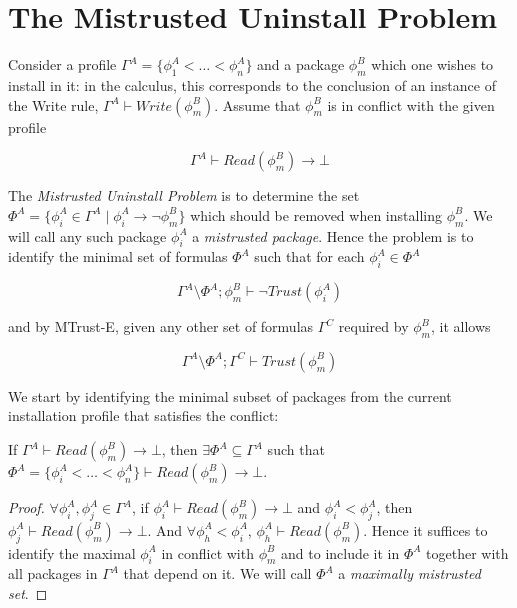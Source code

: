 \documentclass[]{llncs}
\begin{document}
\section{The Mistrusted Uninstall Problem}\label{sec:mistrusted}

Consider a profile $\Gamma^{A}=\{\phi_{1}^{A}< \dots< \phi_{n}^{A}\}$ and a package $\phi^{B}_{m}$ which one wishes to install in it: in the calculus, this corresponds to the conclusion of an instance of the Write rule, $\Gamma^{A}\vdash Write(\phi^{B}_{m})$. Assume that $\phi^{B}_{m}$ is in conflict with the given profile

$$\Gamma^{A}\vdash Read(\phi^{B}_{m}) \rightarrow \bot$$

The \textit{Mistrusted Uninstall Problem} is to determine the set $\Phi^{A}=\{\phi^{A}_{i}\in \Gamma^{A}\mid \phi^{A}_{i}\rightarrow \neg \phi^{B}_{m}\}$ which should be removed when installing $\phi^{B}_{m}$. We will call any such package $\phi^{A}_{i}$ a \textit{mistrusted package}. Hence the problem is to identify the minimal set of formulas $\Phi^{A}$ such that for each $\phi_{i}^{A}\in\Phi^{A}$

$$\Gamma^{A}\setminus \Phi^{A}; \phi^{B}_{m}\vdash \neg Trust(\phi^{A}_{i})$$

and by MTrust-E, given any other set of formulas $\Gamma^{C}$ required by $\phi^{B}_{m}$, it allows

$$\Gamma^{A}\setminus \Phi^{A}; \Gamma^{C} \vdash Trust(\phi^{B}_{m})$$


We start by identifying the minimal subset of packages from the current installation profile that satisfies the conflict:

\begin{lemma}\label{th:gen2}
	If $\Gamma^{A}\vdash Read(\phi^{B}_{m})\rightarrow \bot$, then $\exists \Phi^{A}\subseteq\Gamma^{A}$
	such that $ \Phi^{A}=\{\phi^{A}_{i}< \dots< \phi^{A}_{n}\} \vdash Read(\phi^{B}_{m})\rightarrow \bot$.
\end{lemma}
%
\begin{proof}
$\forall \phi^{A}_{i}, \phi^{A}_{j}\in \Gamma^{A}$, if $\phi^{A}_{i}\vdash Read(\phi^{B}_{m})\rightarrow \bot$ and $\phi^{A}_{i}<\phi^{A}_{j}$, then $\phi^{A}_{j}\vdash Read(\phi^{B}_{m})\rightarrow \bot$. And $\forall \phi^{A}_{h}<\phi^{A}_{i}$, $\phi^{A}_{h}\vdash Read(\phi^{B}_{m})$. Hence it suffices to identify the maximal $\phi^{A}_{i}$ in conflict with $\phi^{B}_{m}$ and to include it in $\Phi^{A}$ together with all packages in $\Gamma^{A}$ that depend on it. We will call $\Phi^{A}$ a \textit{maximally mistrusted set}.
\end{proof}
\end{document}
